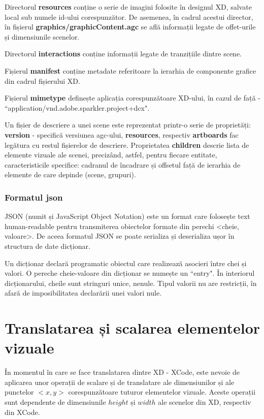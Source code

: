 Directorul  \textbf{resources} conține o serie de imagini folosite în designul XD, salvate local sub numele id-ului corespunzător. De asemenea, în cadrul acestui director, în fișierul \textbf{graphics/graphicContent.agc} se află informații legate de offet-urile și dimensiunile scenelor.

Directorul \textbf{interactions} conține informații legate de tranzițiile dintre scene.

Fișierul \textbf{manifest} conține metadate referitoare la ierarhia de componente grafice din cadrul fișierului XD. 

Fișierul \textbf{mimetype} definește aplicația corespunzătoare XD-ului, în cazul de față - ``application/vnd.adobe.sparkler.project+dcx".

Un fișier de descriere a unei scene este reprezentat printr-o serie de proprietăți:  \textbf{version} - specifică versiunea agc-ului, \textbf{resources}, respectiv \textbf{artboards} fac legătura cu restul fișierelor de descriere. Proprietatea  \textbf{children} descrie lista de elemente vizuale ale scenei, precizând, astfel, pentru fiecare entitate, caracteristicile specifice: cadranul de încadrare și offsetul față de ierarhia de elemente de care depinde (scene, grupuri).

\subsubsection{Formatul json}

JSON (numit și JavaScript Object Notation) este un format care folosește text human-readable pentru transmiterea obiectelor formate din perechi <cheie, valoare>. De aceea formatul JSON se poate serializa și deserializa ușor în structura de date dicționar.

Un dicționar declară programatic obiectul care realizează asocieri între chei și valori. O pereche cheie-valoare din dicționar se numește un ``entry". În interiorul dicționarului, cheile sunt stringuri unice, nenule. Tipul valorii nu are restricții, în afară de imposibilitatea declarării unei valori nule.

\section{Translatarea și scalarea elementelor vizuale}\label{transScal}

În momentul în care se face translatarea dintre XD - XCode, este nevoie de aplicarea unor operații de scalare și de translatare ale dimensiunilor și ale punctelor $<x, y>$ corespunzătoare tuturor elementelor vizuale. Aceste operații sunt dependente de dimensiunile $height$ și $width$ ale scenelor din XD, respectiv din XCode. 

